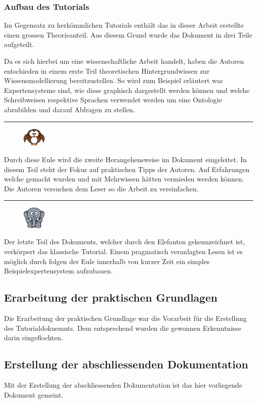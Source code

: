 \subsubsection{Aufbau des Tutorials}
\label{subsec:dokumentation_wissensmodellierung_aufbau}
Im Gegensatz zu herkömmlichen Tutorials enthält das in dieser Arbeit erstellte einen grossen Theorieanteil. Aus diesem Grund wurde das Dokument in drei Teile aufgeteilt. 

Da es sich hierbei um eine wissenschaftliche Arbeit handelt, haben die Autoren entschieden in einem erste Teil  theoretischen Hintergrundwissen zur Wissensmodellierung bereitzustellen. So wird zum Beispiel erläutert was Expertensysteme sind, wie diese graphisch dargestellt werden können und welche Schreibweisen respektive Sprachen verwendet werden um eine Ontologie abzubilden und darauf Abfragen zu stellen.


\noindent\rule[1ex]{\textwidth}{1pt}
\begin{figure}
    \vspace{-12pt}
    \includegraphics[width=0.1\textwidth]{bilder/owl.png}
\end{figure}
Durch diese Eule wird die zweite Herangehensweise im Dokument eingeleitet. In diesem Teil steht der Fokus auf praktischen Tipps der Autoren. Auf Erfahrungen welche gemacht wurden und mit Mehrwissen hätten vermieden werden können. Die Autoren versuchen dem Leser so die Arbeit zu vereinfachen.

\noindent\rule[1ex]{\textwidth}{1pt}
\begin{figure}
    \vspace{-12pt}
    \includegraphics[width=0.1\textwidth]{bilder/elephant.png}
\end{figure}
Der letzte Teil des Dokuments, welcher durch den Elefanten gekennzeichnet ist, verkörpert das klassische Tutorial. Einem pragmatisch veranlagten Lesen ist es möglich durch folgen der Eule innerhalb von kurzer Zeit ein simples Beispielexpertensystem aufzubauen.

\subsection{Erarbeitung der praktischen Grundlagen}
\label{subsec:praktische_grundlagen}

Die Erarbeitung der praktischen Grundlage war die Vorarbeit für die Erstellung des Tutorialdokuemnts. Dem entsprechend wurden die gewonnen Erkenntnisse darin eingeflochten.

\subsection{Erstellung der abschliessenden Dokumentation}
\label{subsec:abschliessende_dokumentation}
Mit der Erstellung der abschliessenden Dokumentation ist das hier vorliegende Dokument gemeint.
